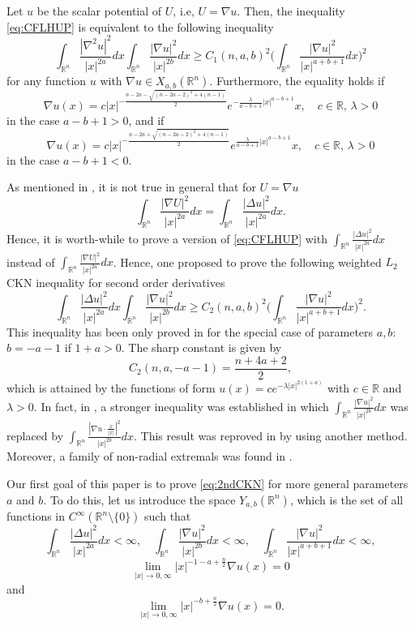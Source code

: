 \documentclass[a4paper,12pt]{article}
\theoremstyle{plain}
\theoremstyle{definition}
\theoremstyle{remark}
\def\R{\mathbb R}%
\def\irn{\int_{\R^n}}
\numberwithin{equation}{section}
\begin{document}
Let $u$ be the scalar potential of $U$, i.e, $U = \nabla u$. Then,  the inequality \eqref{eq:CFLHUP} is equivalent to the following inequality
\begin{equation*}%
\irn \frac{|\nabla^2u|^2}{|x|^{2a}} dx \irn \frac{|\nabla u|^2}{|x|^{2b}} dx \geq C_1(n,a,b)^2 \Big(\irn \frac{|\nabla u|^2}{|x|^{a+b +1}} dx\Big)^2
\end{equation*}
for any function $u$ with $\nabla u \in X_{a,b}(\R^n)$. Furthermore, the equality holds if
\[
\nabla u(x) = c |x|^{-\frac{n -2a - \sqrt{(n-2a -2)^2 + 4(n-1)}}2} e^{-\frac{\lambda}{a-b+1} |x|^{a-b +1}} x,\quad c\in \R,\, \lambda >0
\]
in the case $a -b + 1 >0$, and if
\[
\nabla u(x) = c |x|^{-\frac{n -2a +\sqrt{(n-2a -2)^2 + 4(n-1)}}2} e^{\frac{\lambda}{a-b+1} |x|^{a-b +1}} x,\quad c\in \R,\, \lambda > 0
\]
in the case $a - b + 1 < 0$.

As mentioned in \cite{CFL23}, it is not true in general that for $U = \nabla u$
\[
\int_{\R^n} \frac{|\nabla U|^2}{|x|^{2a}} dx = \int_{\R^n} \frac{|\Delta u|^2}{|x|^{2a}} dx.
\]
Hence, it is worth-while to prove a version of \eqref{eq:CFLHUP} with $\int_{\R^n} \frac{|\Delta u|^2}{|x|^{2a}} dx$ instead of $\int_{\R^n} \frac{|\nabla U|^2}{|x|^{2a}} dx$. Hence, one proposed  to prove the following weighted $L_2$ CKN inequality for second order derivatives
\begin{equation}\label{eq:2ndCKN}
\irn \frac{|\Delta u|^2}{|x|^{2a}} dx \irn \frac{|\nabla u|^2}{|x|^{2b}} dx \geq C_2(n,a,b)^2 \Big(\irn \frac{|\nabla u|^2}{|x|^{a+b +1}} dx\Big)^2.
\end{equation}
This inequality has been only proved in  \cite{DNAFM} for the special case of parameters $a,b$:  $b = -a -1$ if $1 + a >0$. The sharp constant  is given by 
\[
C_2(n,a,-a-1) = \frac{n +4a +2}2,
\]
which is attained by the functions of form $u(x) = c e^{-\lambda |x|^{2(1+a)}}$ with $c\in \R$ and $\lambda >0$. In fact, in \cite{DNAFM}, a stronger inequality was established in which $\irn \frac{|\nabla u|^2}{|x|^{2b}} dx$ was replaced by $\irn \frac{|\nabla u \cdot \frac x{|x|}|^2}{|x|^{2b}} dx$. This result was reproved in \cite{CFL23} by using another method. Moreover, a family of non-radial extremals was found in \cite{CFL23}.

Our first goal of this paper is to prove \eqref{eq:2ndCKN} for more general parameters $a$ and $b$. To do this, let us introduce the space $Y_{a,b}(\R^n)$,  which is the set of all functions in $C^\infty(\R^n\setminus\{0\})$ such that
\[
\irn \frac{|\Delta u|^2}{|x|^{2a}} dx <\infty, \quad \irn \frac{|\nabla u|^2}{|x|^{2b}} dx < \infty,\quad \irn \frac{|\nabla u|^2}{|x|^{a+b+1}} dx < \infty,
\]
\[
\lim_{|x|\to 0,\infty} |x|^{-1-a +\frac n2} \nabla u(x) = 0
\]
and
\[
\lim_{|x|\to 0,\infty} |x|^{-b +\frac n2} \nabla u(x) = 0.
\]
\end{document}
